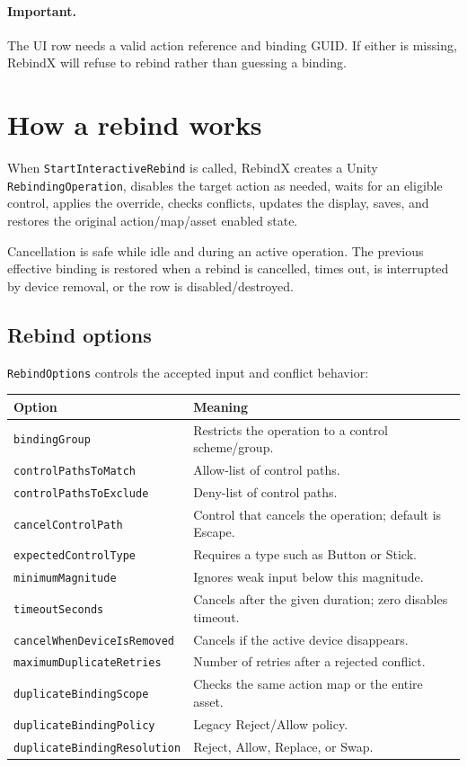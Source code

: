 \documentclass[11pt,a4paper]{article}
\newcommand{\class}[1]{\texttt{#1}}
\newcommand{\warning}[1]{\paragraph{Important.} #1}
\begin{document}
\warning{The UI row needs a valid action reference and binding GUID. If either is missing, RebindX will refuse to rebind rather than guessing a binding.}

\section{How a rebind works}
When \class{StartInteractiveRebind} is called, RebindX creates a Unity \class{RebindingOperation}, disables the target action as needed, waits for an eligible control, applies the override, checks conflicts, updates the display, saves, and restores the original action/map/asset enabled state.

Cancellation is safe while idle and during an active operation. The previous effective binding is restored when a rebind is cancelled, times out, is interrupted by device removal, or the row is disabled/destroyed.

\subsection{Rebind options}
\class{RebindOptions} controls the accepted input and conflict behavior:
\begin{longtable}{p{}p{}}
\toprule
\textbf{Option} & \textbf{Meaning}\\
\midrule
\endhead
\class{bindingGroup} & Restricts the operation to a control scheme/group.\\
\class{controlPathsToMatch} & Allow-list of control paths.\\
\class{controlPathsToExclude} & Deny-list of control paths.\\
\class{cancelControlPath} & Control that cancels the operation; default is Escape.\\
\class{expectedControlType} & Requires a type such as Button or Stick.\\
\class{minimumMagnitude} & Ignores weak input below this magnitude.\\
\class{timeoutSeconds} & Cancels after the given duration; zero disables timeout.\\
\class{cancelWhenDeviceIsRemoved} & Cancels if the active device disappears.\\
\class{maximumDuplicateRetries} & Number of retries after a rejected conflict.\\
\class{duplicateBindingScope} & Checks the same action map or the entire asset.\\
\class{duplicateBindingPolicy} & Legacy Reject/Allow policy.\\
\class{duplicateBindingResolution} & Reject, Allow, Replace, or Swap.\\
\bottomrule
\end{longtable}
\end{document}
